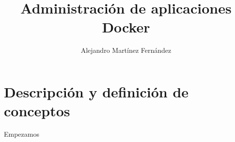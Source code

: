 \documentclass[]{article}
\title{Administración de aplicaciones Docker}
\author{Alejandro Martínez Fernández}
\begin{document}
\begin{titlepage}
	\maketitle
\end{titlepage}
\section{Descripción y definición de conceptos}

Empezamos
\end{document}
